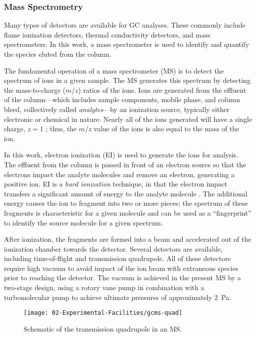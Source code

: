 \documentclass[../main.tex]{subfiles}
\begin{document}
\subsubsection{Mass Spectrometry}

Many types of detectors are available for GC analyses. These commonly include
flame ionization detectors, thermal conductivity detectors, and mass
spectrometers. In this work, a mass spectrometer is used to identify and
quantify the species eluted from the column.

The fundamental operation of a mass spectrometer (MS) is to detect the spectrum
of ions in a given sample. The MS generates this spectrum by detecting the
mass-to-charge ($m/z$) ratios of the ions. Ions are generated
from the effluent of the column---which includes sample components, mobile phase,
and column bleed, collectively called \textit{analytes}---by an ionization source,
typically either electronic or chemical in nature. Nearly all of the ions
generated will have a single charge, $z=1$ \cite{Sparkman2011}; thus,
the $m/z$ value of the ions is also equal to the mass of the ion.

In this work, electron ionization (EI) is used to generate the ions for
analysis. The effluent from the column is passed in front of an electron
source so that the electrons impact the analyte molecules and remove an
electron, generating a positive ion. EI is a \textit{hard ionization}
technique, in that the electron impact transfers a significant amount of energy
to the analyte molecule \cite{Sparkman2011}. The additional energy causes
the ion to fragment into two or more pieces; the spectrum of these fragments
is characteristic for a given molecule and can be used as a ``fingerprint''
to identify the source molecule for a given spectrum.

After ionization, the fragments are formed into a beam and accelerated out of the ionization
chamber towards the detector. Several detectors are available, including
time-of-flight and transmission quadrupole. All of these detectors require
high vacuum to avoid impact of the ion beam with extraneous species
prior to reaching the detector. The vacuum is achieved in the present
MS by a two-stage design, using a rotary vane pump in combination with a
turbomolecular pump to achieve ultimate pressures of approximately \SI{2}{\pascal}.

\begin{figure}
\texttt{[image: 02-Experimental-Facilities/gcms-quad]}
\caption{Schematic of the transmission quadrupole in an MS.}
\label{fig:gcms-quad}
\end{figure}
\end{document}
